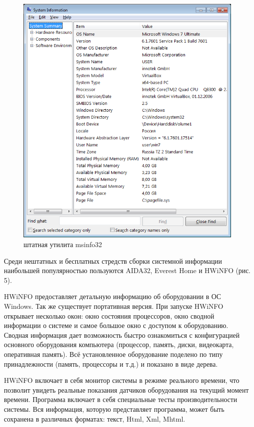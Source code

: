 \documentclass[a4paper, 12pt]{report}		%
\begin{document}
\begin{figure}[h!]
\centering
\includegraphics[scale=0.85]{res/msinfo32}
\caption{штатная утилита msinfo32}
\end{figure}

\newpage
Среди нештатных и бесплатных стредств сборки системной информации наибольшей популярностью пользуются AIDA32, Everest Home и HWiNFO (рис. 5).

HWiNFO предоставляет детальную информацию об оборудовании в ОС Windows. Так же существует портативная версия. При запуске HWiNFO открывает несколько окон: окно состояния процессоров, окно сводной информации о системе и самое большое окно с доступом к оборудованию. Сводная информация дает возможность быстро ознакомиться с конфигурацией основного оборудования компьютера (процессор, память, диски, видеокарта, оперативная память). Всё установленное оборудование поделено по типу принадлежности (память, процессоры и т.д.) и показано в виде дерева.

HWiNFO включает в себя монитор системы в режиме реального времени, что позволит увидеть реальные показания датчиков оборудования на текущий момент времени. Программа включает в себя специальные тесты производительности системы. Вся информация, которую представляет программа, может быть сохранена в различных форматах: текст, Html, Xml, Mhtml.
\end{document}
